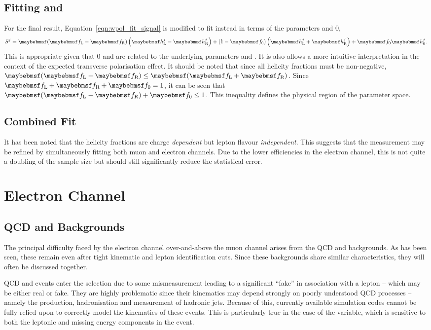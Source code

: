\subsection[Fitting \fLmfR and \f0]{Fitting \boldmath{\fLmfR} and }
\label{sec:wpol_fit_fmfr}
For the final result, Equation~\ref{eqn:wpol_fit_signal} is modified to fit
instead in terms of the parameters \fLmfR and \f0,
\begin{equation*}
S^j = \fLmfR \left (\hLj -\hRj\right) + \left(1-\f0\right)\left(\hLj +\hRj\right) +\f0\hZj.
\end{equation*}
This is appropriate given that \f0 and \fLmfR are related to the underlying
parameters \Azero and \Afour. It is also allows a more intuitive interpretation
in the context of the expected transverse polarisation effect. It should be
noted that since all helicity fractions must be non-negative,
$\fLmfR\leq\fLpfR$. Since $\fL +\fR + \f0 = 1$, it can be seen that $\fLmfR +
\f0 \leq 1$. This inequality defines the physical region of the parameter space.

\subsection{Combined Fit}
It has been noted that the helicity fractions are charge \emph{dependent} but
lepton flavour \emph{independent}. This suggests that the measurement may be
refined by simultaneously fitting both muon and electron channels. Due to the
lower efficiencies in the electron channel, this is not quite a doubling of the
sample size but should still significantly reduce the statistical error.

\section{Electron Channel}
\subsection[\ac{QCD} and \texorpdfstring{\gammajets}{Photon+Jets} Backgounds]{\ac{QCD} and \boldmath{\gammajets} Backgrounds}
The principal difficulty faced by the electron channel over-and-above the muon
channel arises from the \ac{QCD} and \gammajets backgrounds. As has been seen,
these remain even after tight kinematic and lepton identification cuts. Since
these backgrounds share similar characteristics, they will often be discussed
together.

\ac{QCD} and \gammajets events enter the selection due to some mismeasurement
leading to a significant ``fake'' \PtW in association with a lepton -- which may
be either real or fake. They are highly problematic since their kinematics may
depend strongly on poorly understood \ac{QCD} processes -- namely the
production, hadronisation and measurement of hadronic jets. Because of this,
currently available simulation codes cannot be fully relied upon to correctly
model the kinematics of these events. This is particularly true in the case of
the \LP variable, which is sensitive to both the leptonic and missing energy
components in the event.

